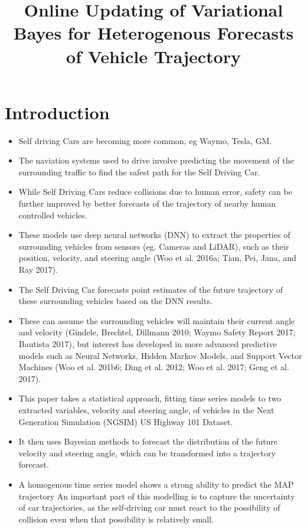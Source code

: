 \documentclass[12pt,a4paper]{article}\usepackage[]{graphicx}\usepackage[]{color}
\title{Online Updating of Variational Bayes for Heterogenous Forecasts of Vehicle Trajectory}
\begin{document}
\maketitle
\section{Introduction}

\begin{itemize}
\item Self driving Cars are becoming more common, eg Waymo, Tesla, GM.
\item The naviation systems used to drive involve predicting the movement of the surrounding traffic to find the safest path for the Self Driving Car.
\item While Self Driving Cars reduce collisions due to human error, safety can be further improved by better forecasts of the trajectory of nearby human controlled vehicles.
\item These models use deep neural networks (DNN) to extract the properties of surrounding vehicles from sensors (eg. Cameras and LiDAR), such as their position, velocity, and steering angle (Woo et al. 2016a; Tian, Pei, Jana, and Ray 2017).
\item The Self Driving Car forecasts point estimates of the future trajectory of these surrounding vehicles based on the DNN results.
\item These can assume the surrounding vehicles will maintain their current angle and velocity (Gindele, Brechtel, Dillmann 2010; Waymo Safety Report 2017; Bautista 2017), but interest has developed in more advanced predictive models such as Neural Networks, Hidden Markov Models, and Support Vector Machines (Woo et al. 201b6; Ding et al. 2012; Woo et al. 2017; Geng et al. 2017).
\item This paper takes a statistical approach, fitting time series models to two extracted variables, velocity and steering angle, of vehicles in the Next Generation Simulation (NGSIM) US Highway 101 Dataset.
\item It then uses Bayesian methods to forecast the distribution of the future velocity and steering angle, which can be transformed into a trajectory forecast.
\item A homogenous time series model shows a strong ability to predict the MAP trajectory
\itme An important part of this modelling is to capture the uncertainty of car trajectories, as the self-driving car must react to the possibility of collision even when that possibility is relatively small.

\end{itemize}
\end{document}
